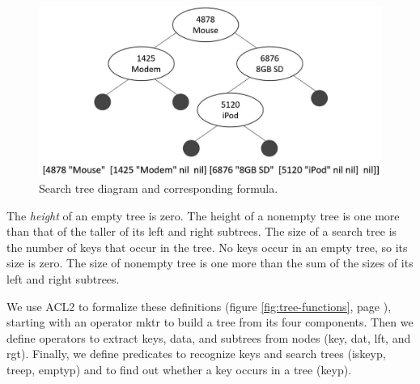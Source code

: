 \begin{figure}
\begin{center}
\includegraphics[scale=1]{images-cmyk/searchtree}
\end{center}
\caption{Search tree diagram and corresponding formula.}
\label{fig:searchtree-diagram}
\end{figure}

\label{height-def}
The \emph{height} of an empty tree is zero.
The height of a nonempty tree is one more than that of the
taller of its left and right subtrees.
The size of a search tree is the number of keys that occur in the tree.
No keys occur in an empty tree, so its size is zero.
The size of nonempty tree is one more than the sum
of the sizes of its left and right subtrees.

We use ACL2 to formalize these definitions
(figure \ref{fig:tree-functions}, page \pageref{fig:tree-functions}),
starting with an operator \textsf{mktr} to build a tree from its four components.
Then we define operators to extract keys, data, and subtrees from nodes
(\textsf{key}, \textsf{dat}, \textsf{lft}, and \textsf{rgt}).
Finally, we define predicates to recognize keys and search trees
(\textsf{iskeyp}, \textsf{treep}, \textsf{emptyp})
and to find out whether a key occurs in a tree (\textsf{keyp}).

